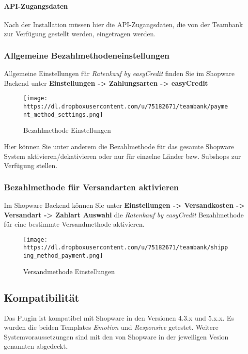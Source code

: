 \paragraph{API-Zugangsdaten}\label{api-zugangsdaten}

Nach der Installation müssen hier die API-Zugangsdaten, die von der
Teambank zur Verfügung gestellt werden, eingetragen werden.

\subsubsection{Allgemeine
Bezahlmethodeneinstellungen}\label{allgemeine-bezahlmethodeneinstellungen}

Allgemeine Einstellungen für \emph{Ratenkauf by easyCredit} finden Sie
im Shopware Backend unter \textbf{Einstellungen -\textgreater{}
Zahlungsarten -\textgreater{} easyCredit}

\begin{figure}[htbp]
\centering
\texttt{[image: https://dl.dropboxusercontent.com/u/75182671/teambank/payment\_method\_settings.png]}
\caption{Bezahlmethode Einstellungen}
\end{figure}

Hier können Sie unter anderem die Bezahlmethode für das gesamte Shopware
System aktivieren/dekativieren oder nur für einzelne Länder bzw.
Subshops zur Verfügung stellen.

\subsubsection{Bezahlmethode für Versandarten
aktivieren}\label{bezahlmethode-fuxfcr-versandarten-aktivieren}

Im Shopware Backend können Sie unter \textbf{Einstellungen
-\textgreater{} Versandkosten -\textgreater{} Versandart -\textgreater{}
Zahlart Auswahl} die \emph{Ratenkauf by easyCredit} Bezahlmethode für
eine bestimmte Versandmethode aktivieren.

\begin{figure}[htbp]
\centering
\texttt{[image: https://dl.dropboxusercontent.com/u/75182671/teambank/shipping\_method\_payment.png]}
\caption{Versandmethode Einstellungen}
\end{figure}

\subsection{Kompatibilität}\label{kompatibilituxe4t}

Das Plugin ist kompatibel mit Shopware in den Versionen 4.3.x und 5.x.x.
Es wurden die beiden Templates \emph{Emotion} und \emph{Responsive}
getestet. Weitere Systemvoraussetzungen sind mit den von Shopware in der
jeweiligen Vesion genannten abgedeckt.
